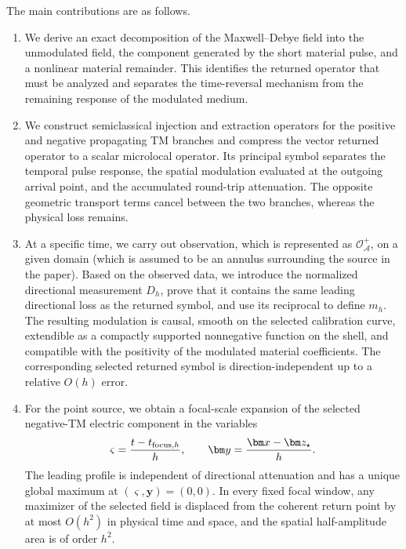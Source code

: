 \documentclass[11pt,reqno]{amsart}
\numberwithin{equation}{section}
\begin{document}
The main contributions are as follows.
\begin{enumerate}[label=(\roman*),leftmargin=2.5em]
 \item
 We derive an exact decomposition of the Maxwell--Debye field into the unmodulated field, the component generated by the short material pulse, and a nonlinear material remainder. This identifies the returned operator that must be analyzed and separates the time-reversal mechanism from the remaining response of the modulated medium.

 \item
 We construct semiclassical injection and extraction operators for the positive and negative propagating TM branches and compress the vector returned operator to a scalar microlocal operator. Its principal symbol separates the temporal pulse response, the spatial modulation evaluated at the outgoing arrival point, and the accumulated round-trip attenuation. The opposite geometric transport terms cancel between the two branches, whereas the physical loss remains.

 \item
 At a specific time, we carry out observation, which is represented as $\mathcal O_{\mathcal A}^+$, on a given domain (which is assumed to be an annulus surrounding the source in the paper). Based on the observed data, we introduce the normalized directional measurement $D_h$, prove that it contains the same leading directional loss as the returned symbol, and use its reciprocal to define $m_h$. The resulting modulation is causal, smooth on the selected calibration curve, extendible as a compactly supported nonnegative function on the shell, and compatible with the positivity of the modulated material coefficients. The corresponding selected returned symbol is direction-independent up to a relative $O(h)$ error.

 \item
 For the point source, we obtain a focal-scale expansion of the selected negative-TM electric component in the variables
 $$
  \varsigma=\frac{t-t_{{\rm focus},h}}{h},
  \qquad
  \bm y=\frac{\bm x-\bm z_\star}{h}.
 $$
 The leading profile is independent of directional attenuation and has a unique global maximum at $(\varsigma,\bm y)=(0,0)$. In every fixed focal window, any maximizer of the selected field is displaced from the coherent return point by at most $O(h^2)$ in physical time and space, and the spatial half-amplitude area is of order $h^2$.
\end{enumerate}
\end{document}
